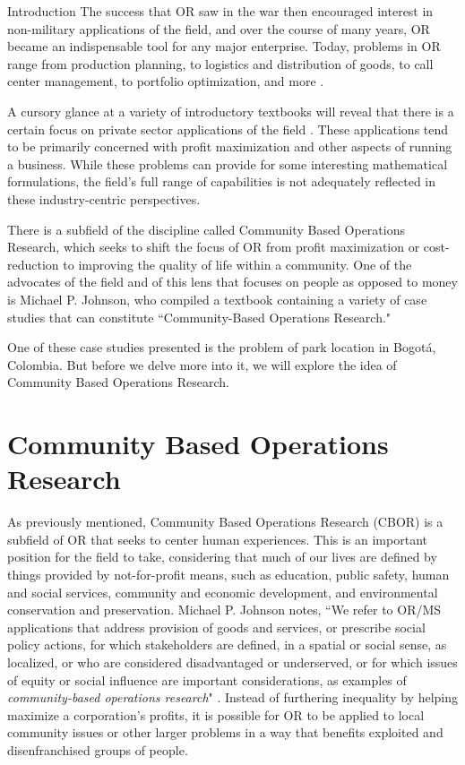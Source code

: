 \documentclass[12pt]{pom_thesis}
\theoremstyle{definition}
\begin{document}
\begin{chapter}{Introduction}
	The success that OR saw in the war then encouraged interest in non-military applications of the field, and over the course of many years, OR became an indispensable tool for any major enterprise. Today, problems in OR range from production planning, to logistics and distribution of goods, to call center management, to portfolio optimization, and more \cite{community-or}.

	A cursory glance at a variety of introductory textbooks will reveal that there is a certain focus on private sector applications of the field \cite{community-or}. These applications tend to be primarily concerned with profit maximization and other aspects of running a business. While these problems can provide for some interesting mathematical formulations, the field's full range of capabilities is not adequately reflected in these industry-centric perspectives.
	
	There is a subfield of the discipline called Community Based Operations Research, which seeks to shift the focus of OR from profit maximization or cost-reduction to improving the quality of life within a community. One of the advocates of the field and of this lens that focuses on people as opposed to money is Michael P. Johnson, who compiled a textbook containing a variety of case studies that can constitute ``Community-Based Operations Research." 
	
	One of these case studies presented is the problem of park location in Bogot\'{a}, Colombia. But before we delve more into it, we will explore the idea of Community Based Operations Research.

%
%	
\section{Community Based Operations Research}
As previously mentioned, Community Based Operations Research (CBOR) is a subfield of OR that seeks to center human experiences. This is an important position for the field to take, considering that much of our lives are defined by things provided by not-for-profit means, such as education, public safety, human and social services, community and economic development, and environmental conservation and preservation. Michael P. Johnson notes, ``We refer to OR/MS applications that address provision of goods and services, or prescribe social policy actions, for which stakeholders are defined, in a spatial or social sense, as localized, or who are considered disadvantaged or underserved, or for which issues of equity or social influence are important considerations, as examples of \textit{community-based operations research}" \cite{community-or}. Instead of furthering inequality by helping maximize a corporation's profits, it is possible for OR to be applied to local community issues or other larger problems in a way that benefits exploited and disenfranchised groups of people. 


\end{chapter}
\end{document}
